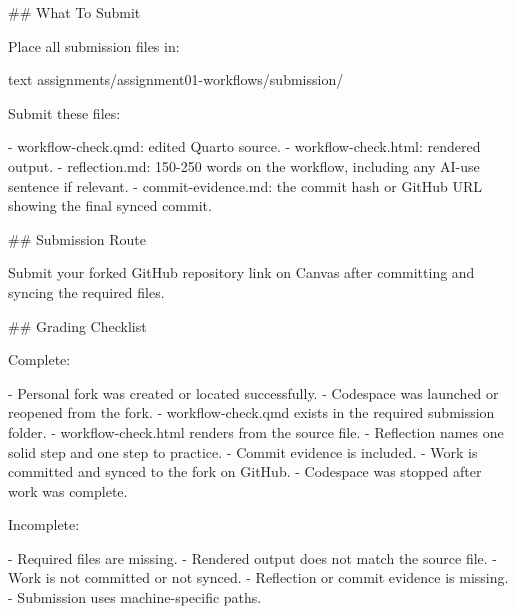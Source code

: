 \documentclass[
  letterpaper,
  DIV=11,
  numbers=noendperiod,
  oneside]{scrreprt}
\newenvironment{Shaded}{\begin{snugshade}}{\end{snugshade}}
\newcommand{\FunctionTok}[1]{\textcolor[rgb]{0.28,0.35,0.67}{#1}}
\newcommand{\InformationTok}[1]{\textcolor[rgb]{0.37,0.37,0.37}{#1}}
\newcommand{\NormalTok}[1]{\textcolor[rgb]{0.00,0.23,0.31}{#1}}
\newcommand{\SpecialStringTok}[1]{\textcolor[rgb]{0.13,0.47,0.30}{#1}}
\begin{document}
\begin{Shaded}
\begin{Highlighting}[numbers=left,,]
\FunctionTok{\#\# What To Submit}

\NormalTok{Place all submission files in:}

\InformationTok{\textasciigrave{}\textasciigrave{}\textasciigrave{}text}
\InformationTok{assignments/assignment01{-}workflows/submission/}
\InformationTok{\textasciigrave{}\textasciigrave{}\textasciigrave{}}

\NormalTok{Submit these files:}

\SpecialStringTok{{-} }\InformationTok{\textasciigrave{}workflow{-}check.qmd\textasciigrave{}}\NormalTok{: edited Quarto source.}
\SpecialStringTok{{-} }\InformationTok{\textasciigrave{}workflow{-}check.html\textasciigrave{}}\NormalTok{: rendered output.}
\SpecialStringTok{{-} }\InformationTok{\textasciigrave{}reflection.md\textasciigrave{}}\NormalTok{: 150{-}250 words on the workflow, including any AI{-}use sentence if relevant.}
\SpecialStringTok{{-} }\InformationTok{\textasciigrave{}commit{-}evidence.md\textasciigrave{}}\NormalTok{: the commit hash or GitHub URL showing the final synced commit.}

\FunctionTok{\#\# Submission Route}

\NormalTok{Submit your forked GitHub repository link on Canvas after committing and syncing the required files.}

\FunctionTok{\#\# Grading Checklist}

\NormalTok{Complete:}

\SpecialStringTok{{-} }\NormalTok{Personal fork was created or located successfully.}
\SpecialStringTok{{-} }\NormalTok{Codespace was launched or reopened from the fork.}
\SpecialStringTok{{-} }\InformationTok{\textasciigrave{}workflow{-}check.qmd\textasciigrave{}}\NormalTok{ exists in the required submission folder.}
\SpecialStringTok{{-} }\InformationTok{\textasciigrave{}workflow{-}check.html\textasciigrave{}}\NormalTok{ renders from the source file.}
\SpecialStringTok{{-} }\NormalTok{Reflection names one solid step and one step to practice.}
\SpecialStringTok{{-} }\NormalTok{Commit evidence is included.}
\SpecialStringTok{{-} }\NormalTok{Work is committed and synced to the fork on GitHub.}
\SpecialStringTok{{-} }\NormalTok{Codespace was stopped after work was complete.}

\NormalTok{Incomplete:}

\SpecialStringTok{{-} }\NormalTok{Required files are missing.}
\SpecialStringTok{{-} }\NormalTok{Rendered output does not match the source file.}
\SpecialStringTok{{-} }\NormalTok{Work is not committed or not synced.}
\SpecialStringTok{{-} }\NormalTok{Reflection or commit evidence is missing.}
\SpecialStringTok{{-} }\NormalTok{Submission uses machine{-}specific paths.}


\end{Highlighting}
\end{Shaded}
\end{document}
